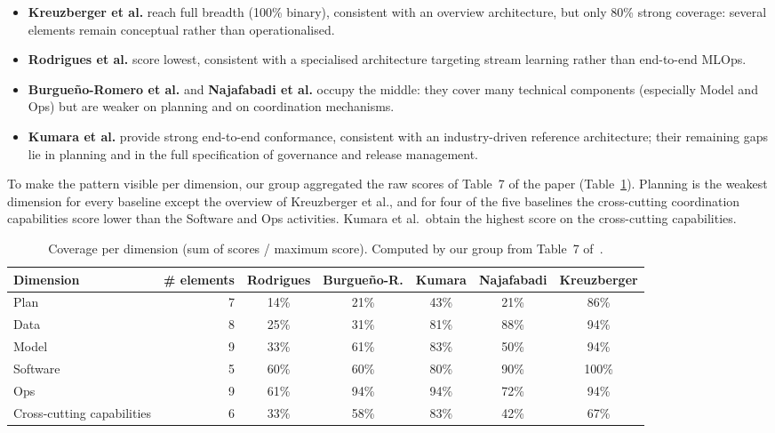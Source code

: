 \documentclass[11pt,a4paper]{article}
\begin{document}
\begin{itemize}
  \item \textbf{Kreuzberger et al.} reach full breadth (100\% binary), consistent with an overview architecture, but only 80\% strong coverage: several elements remain conceptual rather than operationalised.
  \item \textbf{Rodrigues et al.} score lowest, consistent with a specialised architecture targeting stream learning rather than end-to-end MLOps.
  \item \textbf{Burgue\~no-Romero et al.} and \textbf{Najafabadi et al.} occupy the middle: they cover many technical components (especially Model and Ops) but are weaker on planning and on coordination mechanisms.
  \item \textbf{Kumara et al.} provide strong end-to-end conformance, consistent with an industry-driven reference architecture; their remaining gaps lie in planning and in the full specification of governance and release management.
\end{itemize}

To make the pattern visible per dimension, our group aggregated the raw scores of Table~7 of the paper (Table~\ref{tab:perdim}). Planning is the weakest dimension for every baseline except the overview of Kreuzberger et al., and for four of the five baselines the cross-cutting coordination capabilities score lower than the Software and Ops activities. Kumara et al.\ obtain the highest score on the cross-cutting capabilities.

\begin{table}[h]
\centering
\caption{Coverage per dimension (sum of scores / maximum score). Computed by our group from Table~7 of~\cite{daoud2026}.}\label{tab:perdim}
\small
\begin{tabular}{@{}lrccccc@{}}
\toprule
Dimension & \# elements & Rodrigues & Burgue\~no-R. & Kumara & Najafabadi & Kreuzberger \\
\midrule
Plan & 7 & 14\% & 21\% & 43\% & 21\% & 86\% \\
Data & 8 & 25\% & 31\% & 81\% & 88\% & 94\% \\
Model & 9 & 33\% & 61\% & 83\% & 50\% & 94\% \\
Software & 5 & 60\% & 60\% & 80\% & 90\% & 100\% \\
Ops & 9 & 61\% & 94\% & 94\% & 72\% & 94\% \\
Cross-cutting capabilities & 6 & 33\% & 58\% & 83\% & 42\% & 67\% \\
\bottomrule
\end{tabular}
\end{table}
\end{document}
